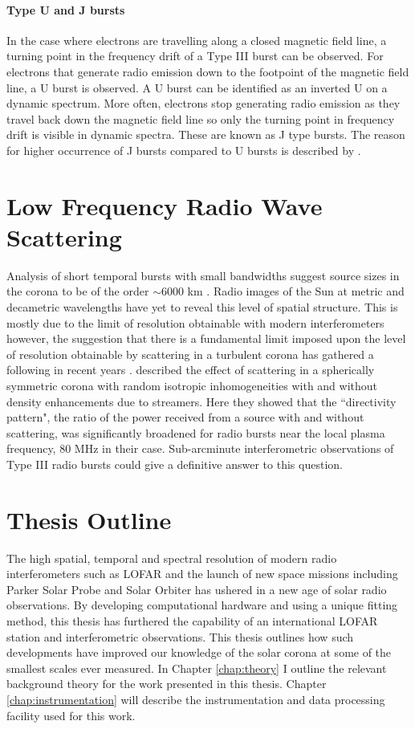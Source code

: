 \paragraph{Type U and J bursts}
In the case where electrons are travelling along a closed magnetic field line, a turning point in the frequency drift of a Type III burst can be observed. For electrons that generate radio emission down to the footpoint of the magnetic field line, a U burst is observed. A U burst can be identified as an inverted U on a dynamic spectrum. More often, electrons stop generating radio emission as they travel back down the magnetic field line so only the turning point in frequency drift is visible in dynamic spectra. These are known as J type bursts. The reason for higher occurrence of J bursts compared to U bursts is described by \cite{Reid2017}.

\section{Low Frequency Radio Wave Scattering}

Analysis of short temporal bursts with small bandwidths suggest source sizes in the corona to be of the order $\sim 6000$ km \citep{McConnell1980}. Radio images of the Sun at metric and decametric wavelengths have yet to reveal this level of spatial structure. This is mostly due to the limit of resolution obtainable with modern interferometers however, the suggestion that there is a fundamental limit imposed upon the level of resolution obtainable by scattering in a turbulent corona \citep{Bastian1994} has gathered a following in recent years \citep{Kontar2017}. \cite{Riddle1974} described the effect of scattering in a spherically symmetric corona with random isotropic inhomogeneities with and without density enhancements due to streamers. Here they showed that the ``directivity pattern", the ratio of the power received from a source with and without scattering, was significantly broadened for radio bursts near the local plasma frequency, 80 MHz in their case.
Sub-arcminute interferometric observations of Type III radio bursts could give a definitive answer to this question.



\section{Thesis Outline}
The high spatial, temporal and spectral resolution of modern radio interferometers such as LOFAR and the launch of new space missions including Parker Solar Probe and Solar Orbiter has ushered in a new age of solar radio observations. By developing computational hardware and using a unique fitting method, this thesis has furthered the capability of an international LOFAR station and interferometric observations. This thesis outlines how such developments have improved our knowledge of the solar corona at some of the smallest scales ever measured. In Chapter \ref{chap:theory} I outline the relevant background theory for the work presented in this thesis. Chapter \ref{chap:instrumentation} will describe the instrumentation and data processing facility used for this work. 
 
